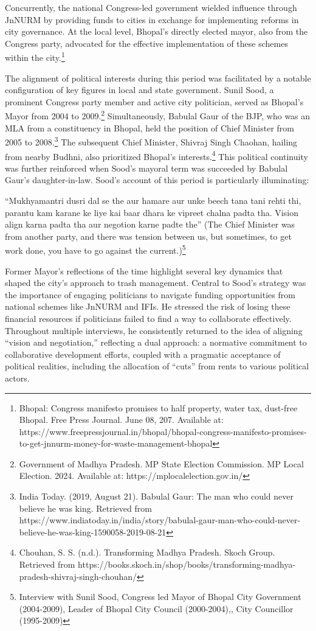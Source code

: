 Concurrently, the national Congress-led government wielded influence through JnNURM by providing funds to cities in exchange for implementing reforms in city governance. At the local level, Bhopal's directly elected mayor, also from the Congress party, advocated for the effective implementation of these schemes within the city.\footnote{Bhopal: Congress manifesto promises to half property, water tax, dust-free Bhopal. Free Press Journal. June 08, 207. Available at: https://www.freepressjournal.in/bhopal/bhopal-congress-manifesto-promises-to-get-jnnurm-money-for-waste-management-bhopal}

The alignment of political interests during this period was facilitated by a notable configuration of key figures in local and state government. Sunil Sood, a prominent Congress party member and active city politician, served as Bhopal's Mayor from 2004 to 2009.\footnote{Government of Madhya Pradesh. MP State Election Commission. MP Local Election. 2024. Available at: https://mplocalelection.gov.in/} Simultaneously, Babulal Gaur of the BJP, who was an MLA from a constituency in Bhopal, held the position of Chief Minister from 2005 to 2008.\footnote{India Today. (2019, August 21). Babulal Gaur: The man who could never believe he was king. Retrieved from https://www.indiatoday.in/india/story/babulal-gaur-man-who-could-never-believe-he-was-king-1590058-2019-08-21} The subsequent Chief Minister, Shivraj Singh Chaohan, hailing from nearby Budhni, also prioritized Bhopal's interests.\footnote{Chouhan, S. S. (n.d.). Transforming Madhya Pradesh. Skoch Group. Retrieved from https://books.skoch.in/shop/books/transforming-madhya-pradesh-shivraj-singh-chouhan/} This political continuity was further reinforced when Sood's mayoral term was succeeded by Babulal Gaur's daughter-in-law. Sood's account of this period is particularly illuminating:

``Mukhyamantri dusri dal se the aur hamare aur unke beech tana tani rehti thi, parantu kam karane ke liye kai baar dhara ke vipreet chalna padta tha. Vision align karna padta tha aur negotion karne padte the'' (The Chief Minister was from another party, and there was tension between us, but sometimes, to get work done, you have to go against the current.)\footnote{Interview with Sunil Sood, Congress led Mayor of Bhopal City Government (2004-2009), Leader of Bhopal City Council (2000-2004),, City Councillor (1995-2009)}

Former Mayor's reflections of the time highlight several key dynamics that shaped the city's approach to trash management. Central to Sood's strategy was the importance of engaging politicians to navigate funding opportunities from national schemes like JnNURM and IFIs. He stressed the risk of losing these financial resources if politicians failed to find a way to collaborate effectively. Throughout multiple interviews, he consistently returned to the idea of aligning ``vision and negotiation,'' reflecting a dual approach: a normative commitment to collaborative development efforts, coupled with a pragmatic acceptance of political realities, including the allocation of ``cuts'' from rents to various political actors.

